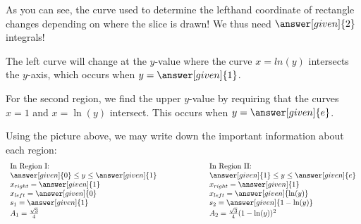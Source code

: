 \documentclass{ximera}
\begin{document}
\begin{example}
\begin{explanation}
\begin{image}
            \end{image}
            
            
As you can see, the curve used to determine the lefthand coordinate of rectangle changes depending on where the slice is drawn! We thus need $\answer[given]{2}$ integrals!

The left curve will change at the $y$-value where the curve $x=ln(y)$ intersects the $y$-axis, which occurs when $y=\answer[given]{1}$.  

For the second region, we find the upper $y$-value by requiring that the curves $x=1$ and $x=\ln(y)$ intersect. This occurs when $y=\answer[given]{e}$.

Using the picture above, we may write down the important information about each region: 
\[
\begin{array}{ll}
\text{In Region I:}  & \text{In Region II:}  \\
\answer[given]{0} \le y \le \answer[given]{1}  \qquad \qquad \qquad & \answer[given]{1} \le y \le \answer[given]{e}\\
x_{right} = \answer[given]{1}    &  x_{right} = \answer[given]{1} \\
x_{left} = \answer[given]{0}  & x_{left} = \answer[given]{\ln(y)} \\
s_1= \answer[given]{1} & s_2= \answer[given]{1-\ln(y)} \\
A_1 = \frac{\sqrt{3}}{4} &  A_2  = \frac{\sqrt{3}}{4}(1-\ln(y))^2 \\
\end{array}
\]


\end{explanation}
\end{example}
\end{document}
